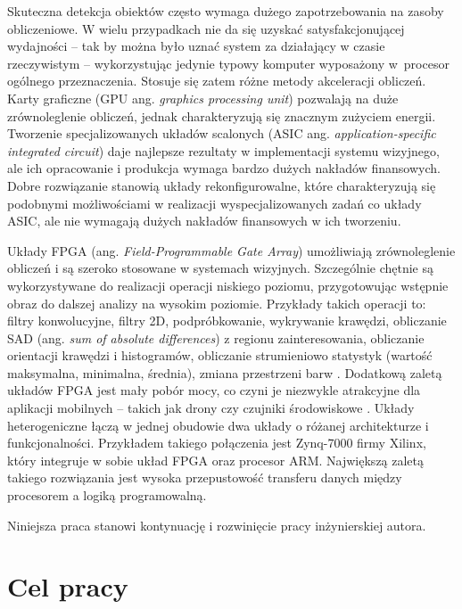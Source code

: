 Skuteczna detekcja obiektów często wymaga dużego zapotrzebowania na zasoby obliczeniowe. 
W wielu przypadkach nie da się uzyskać satysfakcjonującej wydajności -- tak by można było uznać system za działający w czasie rzeczywistym -- wykorzystując jedynie typowy komputer wyposażony w~procesor ogólnego przeznaczenia. 
Stosuje się zatem różne metody akceleracji obliczeń. 
Karty graficzne (GPU ang. \textit{graphics processing unit}) pozwalają na duże zrównoleglenie obliczeń, jednak charakteryzują się znacznym zużyciem energii. %
Tworzenie specjalizowanych układów scalonych (ASIC ang. \textit{application-specific integrated circuit}) daje najlepsze rezultaty w implementacji systemu wizyjnego, ale ich opracowanie i produkcja wymaga bardzo dużych nakładów finansowych. %
Dobre rozwiązanie stanowią układy rekonfigurowalne, które charakteryzują się podobnymi możliwościami w realizacji wyspecjalizowanych zadań co układy ASIC, ale nie wymagają dużych nakładów finansowych w ich tworzeniu. %

Układy FPGA (ang. \textit{Field-Programmable Gate Array}) umożliwiają zrównoleglenie obliczeń i są szeroko stosowane w systemach wizyjnych. 
Szczególnie chętnie są wykorzystywane do realizacji operacji niskiego poziomu, przygotowując wstępnie obraz do dalszej analizy na wysokim poziomie. 
Przykłady takich operacji to: filtry konwolucyjne, filtry 2D, podpróbkowanie, wykrywanie krawędzi, obliczanie SAD (ang. \textit{sum of absolute differences}) z regionu zainteresowania, obliczanie orientacji krawędzi i histogramów, obliczanie strumieniowo statystyk (wartość maksymalna, minimalna, średnia), zmiana przestrzeni barw \cite{ kisacanin2008embedded}. %
Dodatkową zaletą układów FPGA jest mały pobór mocy, co czyni je niezwykle atrakcyjne dla aplikacji mobilnych -- takich jak drony czy czujniki środowiskowe \cite{garcia2014survey}. 
Układy heterogeniczne łączą w jednej obudowie dwa układy o różanej architekturze i funkcjonalności. 
Przykładem takiego połączenia jest Zynq-7000 firmy Xilinx, który integruje w sobie układ FPGA oraz procesor ARM. 
Największą zaletą takiego rozwiązania jest wysoka przepustowość transferu danych między procesorem a logiką programowalną. 

Niniejsza praca stanowi kontynuację i rozwinięcie pracy inżynierskiej autora.

\section{Cel pracy}

